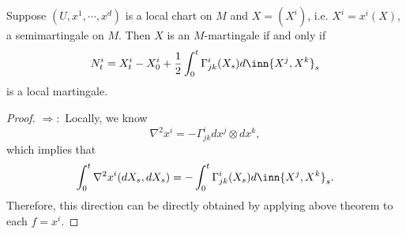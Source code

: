 \begin{prop}
    Suppose $(U,x^1,\cdots,x^d)$ is a local chart on $M$ and $X = (X^i)$, i.e. $X^i = x^i(X)$, a semimartingale on $M$. Then $X$ is an $M$-martingale if and only if
    \begin{equation*}
        N_t^i = X_t^i - X_0^i + \frac{1}{2}\int_0^t \Gamma^i_{jk}(X_s)d\inn{X^j,X^k}_s
    \end{equation*}
    is a local martingale.
\end{prop}
\begin{proof}
    $\Rightarrow:$ Locally, we know
    \begin{equation*}
        \nabla^2 x^i = -\Gamma^i_{jk} dx^j \otimes dx^k,
    \end{equation*}
    which implies that
    \begin{equation*}
        \int_0^t \nabla^2x^i (dX_s,dX_s) = - \int_0^t\Gamma^i_{jk}(X_s) d\inn{X^j,X^k}_s. 
    \end{equation*}
    Therefore, this direction can be directly obtained by applying above theorem to each $f = x^i$.


\end{proof}
